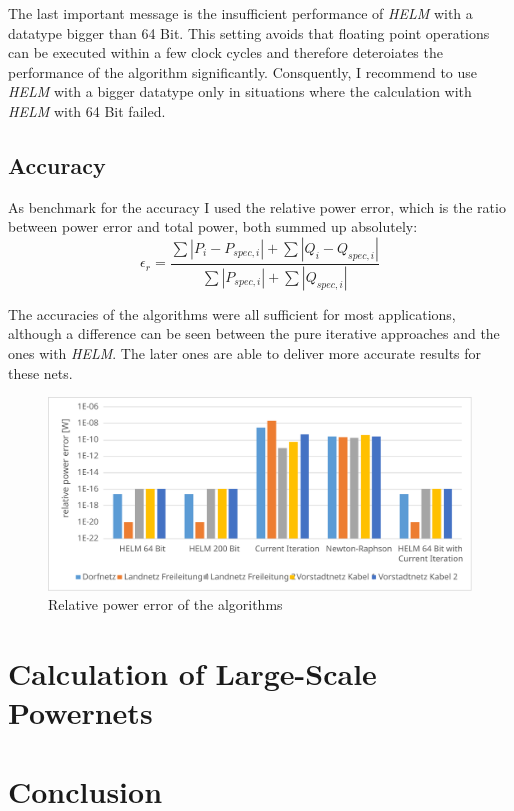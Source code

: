 The last important message is the insufficient performance of \emph{HELM} with a datatype bigger than 64 Bit. This setting avoids that floating point operations can be executed within a few clock cycles and therefore deteroiates the performance of the algorithm significantly. Consquently, I recommend to use \emph{HELM} with a bigger datatype only in situations where the calculation with \emph{HELM} with 64 Bit failed.

\subsection{Accuracy}

As benchmark for the accuracy I used the relative power error, which is the ratio between power error and total power, both summed up absolutely:
\begin{equation}
	\epsilon_r = \frac{\sum |P_i - P_{spec,i}| + \sum |Q_i - Q_{spec,i}|}{\sum |P_{spec,i}| + \sum |Q_{spec,i}|}
\end{equation}

The accuracies of the algorithms  were all sufficient for most applications, although a difference can be seen between the pure iterative approaches and the ones with \emph{HELM}. The later ones are able to deliver more accurate results for these nets.

\begin{figure}
	\centering
	\includegraphics[scale=0.7]{figures/comparison_accuracy}
	\caption[Comparison, accuracy]{Relative power error of the algorithms}
	\label{fig:comparison_accuracy}
\end{figure}

\section{Calculation of Large-Scale Powernets}
\label{sec:large_scale_powernets}

\section{Conclusion}